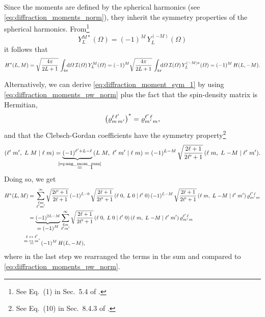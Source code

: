 Since the moments are defined by the spherical harmonics (see
\cref{eq:diffraction_moments_norm}), they inherit the symmetry properties
of the spherical harmonics.  From\footnote{See Eq.~(1) in Sec.~5.4 of
.}
\begin{equation}
  \label{eq:spherical_harm_sym}
  Y_L^{M *}(\Omega)
  = (-1)^M\, Y_L^{(-M)}(\Omega)
\end{equation}
it follows that
\begin{equation}
  \label{eq:diffraction_moment_sym_1}
  H^*(L, M)
  = \sqrt{\frac{4 \pi}{2 L + 1}}\, \int_{4 \pi}\!\!\! \dif{\Omega}\, \mathcal{I}(\Omega)\, Y_L^M(\Omega)
  = (-1)^M \sqrt{\frac{4 \pi}{2 L + 1}}\, \int_{4 \pi}\!\!\! \dif{\Omega}\, \mathcal{I}(\Omega)\, Y_L^{(-M) *}(\Omega)
  = (-1)^M\, H(L, -M).
\end{equation}

Alternatively, we can derive \cref{eq:diffraction_moment_sym_1} by
using \cref{eq:diffraction_moments_pw_norm} plus the fact that the
spin-density matrix is Hermitian,
\ie
\begin{equation}
  \rBrk[1]{\varrho^{\ell\, \ell'}_{m\, m'}}^*
  = \varrho^{\ell'\, \ell}_{m'\, m},
\end{equation}
and that the Clebsch-Gordan coefficients have the symmetry
property\footnote{See Eq.~(10) in Sec.~8.4.3 of
.}
\begin{equation}
  \label{eq:clebsch_sym}
  \clebsch{\ell'}{m'}{L}{M}{\ell}{m}
  = \rdUnderbrace{(-1)^{\ell' + L - \ell}}{\equalUsing{$\mathclap{\text{\cref{eq:ang_mom_sum}}}$}\quad 1}\,
  \clebsch{L}{M}{\ell'}{m'}{\ell}{m}
  = (-1)^{L - M}\, \sqrt{\frac{2 \ell + 1}{2 \ell' + 1}}\, \clebsch{\ell}{m}{L}{-M}{\ell'}{m'}.
\end{equation}
Doing so, we get
\begin{align}
  H^*(L, M)
  ={}& \sum_{\substack{\ell m \\ \ell' m'}}^\infty
    \sqrt{\frac{2 \ell' + 1}{2 \ell + 1}}\,
    (-1)^{L - 0}\, \sqrt{\frac{2 \ell + 1}{2 \ell' + 1}}\, \clebsch{\ell}{0}{L}{0}{\ell'}{0}\,
    (-1)^{L - M}\, \sqrt{\frac{2 \ell + 1}{2 \ell' + 1}}\, \clebsch{\ell}{m}{L}{-M}{\ell'}{m'}\,
    \varrho^{\ell'\, \ell}_{m'\, m} \notag
  \\
  ={}& \dUnderbrace{(-1)^{2 L - M}}{= (-1)^M}
  \sum_{\substack{\ell m \\ \ell' m'}}^\infty
  \sqrt{\frac{2 \ell + 1}{2 \ell' + 1}}\,
  \clebsch{\ell}{0}{L}{0}{\ell'}{0}\, \clebsch{\ell}{m}{L}{-M}{\ell'}{m'}\,
  \varrho^{\ell'\, \ell}_{m'\, m}
  \\
  \equalUsing{$\mathclap{\substack{\displaystyle{\ell \leftrightarrow \ell'} \\ \displaystyle{m \leftrightarrow m'}}}$}{}& \quad
  (-1)^M\, H(L, -M),
\end{align}
where in the last step we rearranged the terms in the sum and compared
to \cref{eq:diffraction_moments_pw_norm}.

